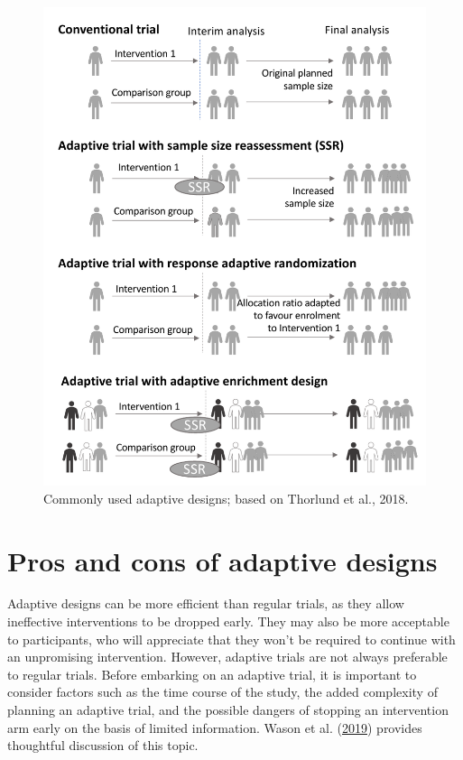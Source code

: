 \documentclass{krantz}
\begin{document}
\begin{figure}

{\centering \includegraphics[width=0.9\linewidth]{images_bw/AdaptiveInfographic} 

}

\caption{Commonly used adaptive designs; based on Thorlund et al., 2018. }\label{fig:adaptivefig}
\end{figure}

\hypertarget{pros-and-cons-of-adaptive-designs}{%
\section{Pros and cons of adaptive designs}\label{pros-and-cons-of-adaptive-designs}}

Adaptive designs can be more efficient than regular trials, as they allow ineffective interventions to be dropped early. They may also be more acceptable to participants, who will appreciate that they won't be required to continue with an unpromising intervention. However, adaptive trials are not always preferable to regular trials. Before embarking on an adaptive trial, it is important to consider factors such as the time course of the study, the added complexity of planning an adaptive trial, and the possible dangers of stopping an intervention arm early on the basis of limited information. Wason et al. (\protect\hyperlink{ref-wason2019}{2019}) provides thoughtful discussion of this topic.
\end{document}
